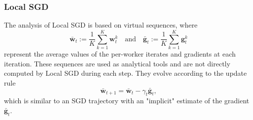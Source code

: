 \documentclass[10pt,twocolumn,letterpaper]{article}
\begin{document}
\subsubsection*{Local SGD}
The analysis of Local SGD is based on virtual sequences, where
\[
\bar{\mathbf{w}}_t := \frac{1}{K} \sum_{k=1}^K \mathbf{w}_t^k \quad \text{and} \quad \bar{\mathbf{g}}_t := \frac{1}{K} \sum_{k=1}^K \mathbf{g}_t^k
\]
represent the average values of the per-worker iterates and gradients at each iteration. These sequences are used as analytical tools and are not directly computed by Local SGD during each step. They evolve according to the update rule
\[
\bar{\mathbf{w}}_{t+1} = \bar{\mathbf{w}}_t - \gamma_t \bar{\mathbf{g}}_t,
\]
which is similar to an SGD trajectory with an "implicit" estimate of the gradient \(\bar{\mathbf{g}}_t\).
\end{document}
